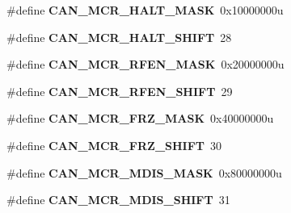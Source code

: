 \begin{DoxyCompactItemize}
\item 
\hypertarget{group___c_a_n___register___masks_gad5282ba01498ad05fa9ce4387050f1df}{}\#define {\bfseries C\+A\+N\+\_\+\+M\+C\+R\+\_\+\+H\+A\+L\+T\+\_\+\+M\+A\+S\+K}~0x10000000u\label{group___c_a_n___register___masks_gad5282ba01498ad05fa9ce4387050f1df}

\item 
\hypertarget{group___c_a_n___register___masks_gab976a082962ddeb0a7738bc5385b35da}{}\#define {\bfseries C\+A\+N\+\_\+\+M\+C\+R\+\_\+\+H\+A\+L\+T\+\_\+\+S\+H\+I\+F\+T}~28\label{group___c_a_n___register___masks_gab976a082962ddeb0a7738bc5385b35da}

\item 
\hypertarget{group___c_a_n___register___masks_ga55cd060ac6cdad670aeb97522a118930}{}\#define {\bfseries C\+A\+N\+\_\+\+M\+C\+R\+\_\+\+R\+F\+E\+N\+\_\+\+M\+A\+S\+K}~0x20000000u\label{group___c_a_n___register___masks_ga55cd060ac6cdad670aeb97522a118930}

\item 
\hypertarget{group___c_a_n___register___masks_gaffab6b0e09ace8e09cb1487dd6639955}{}\#define {\bfseries C\+A\+N\+\_\+\+M\+C\+R\+\_\+\+R\+F\+E\+N\+\_\+\+S\+H\+I\+F\+T}~29\label{group___c_a_n___register___masks_gaffab6b0e09ace8e09cb1487dd6639955}

\item 
\hypertarget{group___c_a_n___register___masks_ga1b55e4024cec7ad30bcba945a70c3383}{}\#define {\bfseries C\+A\+N\+\_\+\+M\+C\+R\+\_\+\+F\+R\+Z\+\_\+\+M\+A\+S\+K}~0x40000000u\label{group___c_a_n___register___masks_ga1b55e4024cec7ad30bcba945a70c3383}

\item 
\hypertarget{group___c_a_n___register___masks_gae3aac50a6bba3516d60fd881e8a8b069}{}\#define {\bfseries C\+A\+N\+\_\+\+M\+C\+R\+\_\+\+F\+R\+Z\+\_\+\+S\+H\+I\+F\+T}~30\label{group___c_a_n___register___masks_gae3aac50a6bba3516d60fd881e8a8b069}

\item 
\hypertarget{group___c_a_n___register___masks_gaadea43214ec6dcbab21d59988ae401bb}{}\#define {\bfseries C\+A\+N\+\_\+\+M\+C\+R\+\_\+\+M\+D\+I\+S\+\_\+\+M\+A\+S\+K}~0x80000000u\label{group___c_a_n___register___masks_gaadea43214ec6dcbab21d59988ae401bb}

\item 
\hypertarget{group___c_a_n___register___masks_ga15f1bf3b87536155c2b13f279b06ba93}{}\#define {\bfseries C\+A\+N\+\_\+\+M\+C\+R\+\_\+\+M\+D\+I\+S\+\_\+\+S\+H\+I\+F\+T}~31\label{group___c_a_n___register___masks_ga15f1bf3b87536155c2b13f279b06ba93}


\end{DoxyCompactItemize}
